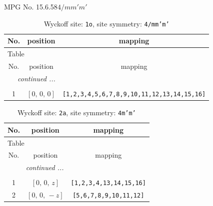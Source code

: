 \documentclass[fleqn,8pt]{jsarticle}
\begin{document}
\setcounter{MaxMatrixCols}{32}

\renewcommand{\tablename}{Table~}
\renewcommand{\figurename}{Figure~}
\begin{center}
\LARGE
MPG No. 15.6.58\quad$4/mm'm'$
\end{center}
\renewcommand{\arraystretch}{1.2}
\begin{longtable}{ccc}
\caption{Wyckoff site: {\tt 1o}, site symmetry: {\tt 4/mm'm'}}
 \\
 \hline \hline
No. & position & mapping \\ \hline \endfirsthead

\multicolumn{2}{l}{\tablename\ \thetable{}} \\
 \hline \hline
No. & position & mapping \\ \hline \endhead

 \hline \hline
\multicolumn{2}{r}{\footnotesize\it continued ...} \\ \endfoot

 \hline \hline
\multicolumn{2}{r}{} \\ \endlastfoot

1 & $\left[ 0,\, 0,\, 0 \right]$ & {\tt [1,2,3,4,5,6,7,8,9,10,11,12,13,14,15,16]} \\
\end{longtable}
\renewcommand{\arraystretch}{1.2}
\begin{longtable}{ccc}
\caption{Wyckoff site: {\tt 2a}, site symmetry: {\tt 4m'm'}}
 \\
 \hline \hline
No. & position & mapping \\ \hline \endfirsthead

\multicolumn{2}{l}{\tablename\ \thetable{}} \\
 \hline \hline
No. & position & mapping \\ \hline \endhead

 \hline \hline
\multicolumn{2}{r}{\footnotesize\it continued ...} \\ \endfoot

 \hline \hline
\multicolumn{2}{r}{} \\ \endlastfoot

1 & $\left[ 0,\, 0,\, z \right]$ & {\tt [1,2,3,4,13,14,15,16]} \\ \hline
2 & $\left[ 0,\, 0,\, - z \right]$ & {\tt [5,6,7,8,9,10,11,12]} \\
\end{longtable}
\renewcommand{\arraystretch}{1.2}
\end{document}
